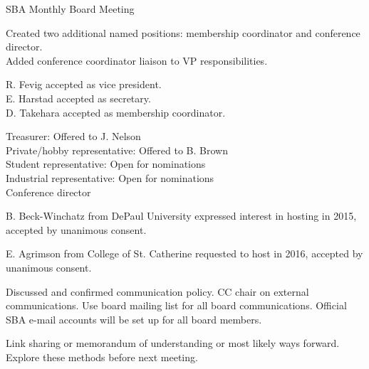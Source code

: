\documentclass[10pt,letterpaper]{article}
\begin{document}
\begin{Minutes}{SBA Monthly Board Meeting}

\maketitle

Created two additional named positions: membership coordinator and conference director.\\
Added conference coordinator liaison to VP responsibilities.

R. Fevig accepted as vice president.\\
E. Harstad accepted as secretary.\\
D. Takehara accepted as membership coordinator.

Treasurer: Offered to J. Nelson\\
Private/hobby representative: Offered to B. Brown\\
Student representative: Open for nominations\\
Industrial representative: Open for nominations\\
Conference director

B. Beck-Winchatz from DePaul University expressed interest in hosting in 2015, accepted by unanimous consent.

E. Agrimson from College of St. Catherine requested to host in 2016, accepted by unanimous consent.

Discussed and confirmed communication policy.
CC chair on external communications.
Use board mailing list for all board communications.
Official SBA e-mail accounts will be set up for all board members.

Link sharing or memorandum of understanding or most likely ways forward. Explore these methods before next meeting.


\end{Minutes}
\end{document}
